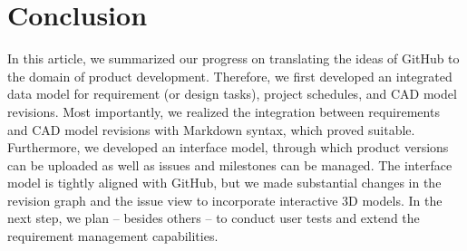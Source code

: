 \section{Conclusion}
\label{sec:conclusion}

In this article, we summarized our progress on translating the ideas of GitHub to the domain of product development.
Therefore, we first developed an integrated data model for requirement (or design tasks), project schedules, and CAD model revisions.
Most importantly, we realized the integration between requirements and CAD model revisions with Markdown syntax, which proved suitable.
Furthermore, we developed an interface model, through which product versions can be uploaded as well as issues and milestones can be managed.
The interface model is tightly aligned with GitHub, but we made substantial changes in the revision graph and the issue view to incorporate interactive 3D models.
In the next step, we plan -- besides others -- to conduct user tests and extend the requirement management capabilities.